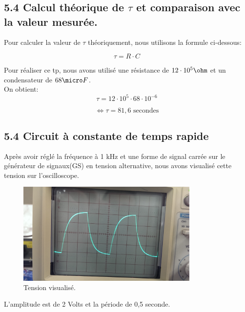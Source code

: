 \documentclass{report}
\begin{document}
\subsection*{5.4 Calcul th\'eorique de $\tau$ et comparaison avec la valeur mesur\'ee.}
\hspace*{0.5cm}
Pour calculer la valeur de $\tau$ th\'eoriquement, nous utilisons la formule ci-dessous:

\begin{equation}
    \tau = R \cdot C
\end{equation}

Pour r\'ealiser ce tp, nous avons utilis\'e une r\'esistance de $12\cdot 10^{5} \ohm$  et un condensateur de $68\micro F$.
\\
On obtient:
\begin{equation}
    \tau = 12\cdot 10^{5} \cdot 68\cdot 10^{-6}
\end{equation}

\begin{equation}
    \Leftrightarrow \tau = 81,6 \text{ secondes}
\end{equation}

\pagebreak
\subsection*{5.4 Circuit \`a constante de temps rapide}
\hspace*{0.5cm}
Apr\`es avoir r\'egl\'e la fr\'equence \`a 1 kHz et une forme de signal carr\'ee sur le g\'en\'erateur de signaux(GS) en tension alternative, nous avons visualis\'e cette tension sur l'oscilloscope.
\begin{figure}[ht!]
\centering
\includegraphics[width=90mm]{E244img1.jpg}
\caption{Tension visualis\'e.}
\label{overflow}
\end{figure}
L'amplitude est de 2 Volts et la p\'eriode de 0,5 seconde.
\end{document}
